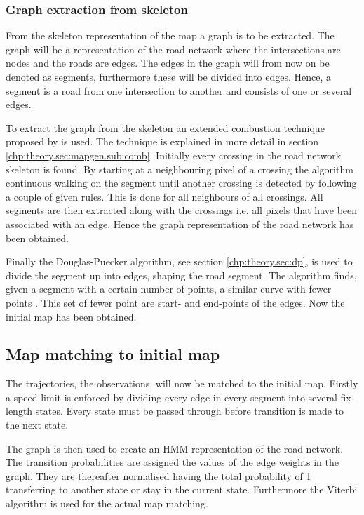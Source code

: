 \subsubsection{Graph extraction from skeleton}

From the skeleton representation of the map a graph is to be extracted. The graph will be a representation of the road network where the intersections are nodes and the roads are edges. The edges in the graph will from now on be denoted as segments, furthermore these will be divided into edges. Hence, a segment is a road from one intersection to another and consists of one or several edges. 

To extract the graph from the skeleton an extended combustion technique proposed by \cite{21inBiagioni} is used. The technique is explained in more detail in section \ref{chp:theory.sec:mapgen.sub:comb}. Initially every crossing in the road network skeleton is found. By starting at a neighbouring pixel of a crossing the algorithm continuous walking on the segment until another crossing is detected by following a couple of given rules. This is done for all neighbours of all crossings. All segments are then extracted along with the crossings i.e. all pixels that have been associated with an edge. Hence the graph representation of the road network has been obtained. 

Finally the Douglas-Puecker algorithm, see section \ref{chp:theory.sec:dp}, is used to divide the segment up into edges, shaping the road segment. The algorithm finds, given a segment with a certain number of points, a similar curve with fewer points \citep{kondaveeti:clusters}. This set of fewer point are start- and end-points of the edges. Now the initial map has been obtained.


\subsection{Map matching to initial map}
The trajectories, the observations, will now be matched to the initial map. Firstly a speed limit is enforced by dividing every edge in every segment into several fix-length states. Every state must be passed through before transition is made to the next state.

The graph is then used to create an \ac{HMM} representation of the road network. The transition probabilities are assigned the values of the edge weights in the graph. They are thereafter normalised having the total probability of 1 transferring to another state or stay in the current state. Furthermore the Viterbi algorithm is used for the actual map matching. 

